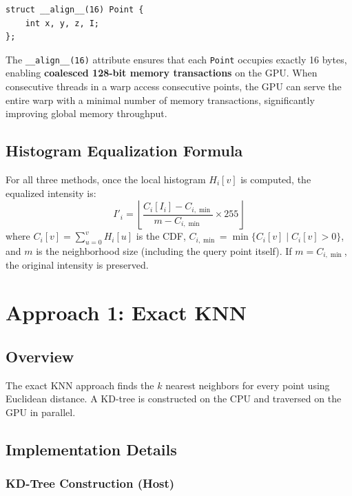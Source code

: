 \documentclass[11pt,a4paper]{article}
\begin{document}
\begin{lstlisting}[caption={Point struct with 16-byte alignment}]
struct __align__(16) Point {
    int x, y, z, I;
};
\end{lstlisting}

The \texttt{\_\_align\_\_(16)} attribute ensures that each \texttt{Point} occupies exactly 16 bytes, enabling \textbf{coalesced 128-bit memory transactions} on the GPU. When consecutive threads in a warp access consecutive points, the GPU can serve the entire warp with a minimal number of memory transactions, significantly improving global memory throughput.

\subsection{Histogram Equalization Formula}

For all three methods, once the local histogram $H_i[v]$ is computed, the equalized intensity is:
\[
    I'_i = \left\lfloor \frac{C_i[I_i] - C_{i,\min}}{m - C_{i,\min}} \times 255 \right\rfloor
\]
where $C_i[v] = \sum_{u=0}^{v} H_i[u]$ is the CDF, $C_{i,\min} = \min\{C_i[v] \mid C_i[v] > 0\}$, and $m$ is the neighborhood size (including the query point itself). If $m = C_{i,\min}$, the original intensity is preserved.

\section{Approach 1: Exact KNN}

\subsection{Overview}

The exact KNN approach finds the $k$ nearest neighbors for every point using Euclidean distance. A KD-tree is constructed on the CPU and traversed on the GPU in parallel.

\subsection{Implementation Details}

\subsubsection{KD-Tree Construction (Host)}
\end{document}
